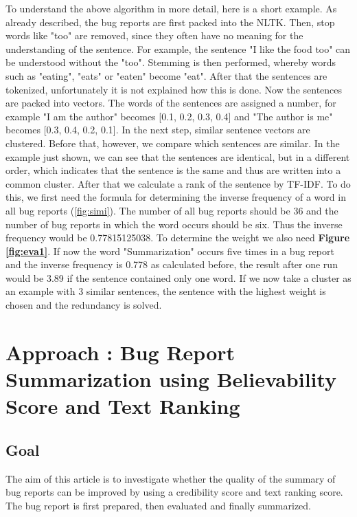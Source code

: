 \documentclass[a4paper,10pt, bibliography=totocnumbered]{scrreprt}
\begin{document}
To understand the above algorithm in more detail, here is a short example. 
As already described, the bug reports are first packed into the NLTK. Then, stop words like "too" are removed, since they often have no meaning for the understanding of the sentence. For example, the sentence "I like the food too" can be understood without the "too". Stemming is then performed, whereby words such as "eating", "eats" or "eaten" become "eat". After that the sentences are tokenized, unfortunately it is not explained how this is done. Now the sentences are packed into vectors. The words of the sentences are assigned a number, for example "I am the author" becomes [0.1, 0.2, 0.3, 0.4] and "The author is me" becomes [0.3, 0.4, 0.2, 0.1]. In the next step, similar sentence vectors are clustered. Before that, however, we compare which sentences are similar. In the example just shown, we can see that the sentences are identical, but in a different order, which indicates that the sentence is the same and thus are written into a common cluster. After that we calculate a rank of the sentence by TF-IDF. To do this, we first need the formula for determining the inverse frequency of a word in all bug reports (\ref{fig:simi}). The number of all bug reports should be 36 and the number of bug reports in which the word occurs should be six. Thus the inverse frequency would be 0.77815125038. To determine the weight we also need \textbf{Figure \ref{fig:eva1}}.
If now the word "Summarization" occurs five times in a bug report and the inverse frequency is 0.778 as calculated before, the result after one run would be 3.89 if the sentence contained only one word. If we now take a cluster as an example with 3 similar sentences, the sentence with the highest weight is chosen and the redundancy is solved. 

\chapter{Approach : Bug Report Summarization using Believability Score and Text Ranking}
\label{approach2}

		
\section{Goal}
The aim of this article is to investigate whether the quality of the summary of bug reports can be improved by using a credibility score and text ranking score. The bug report is first prepared, then evaluated and finally summarized. 
\end{document}
